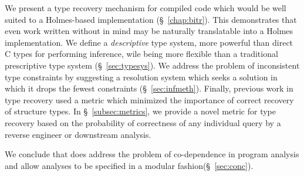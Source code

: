 We present a type recovery mechanism for compiled code which would be well suited to a Holmes-based implementation (\S~\ref{chap:bitr}).
This demonstrates that even work written without \sysname in mind may be naturally translatable into a Holmes implementation.
We define a \emph{descriptive} type system, more powerful than direct C types for performing inference, wile being more flexible than a traditional prescriptive type system (\S~\ref{sec:typesys}).
We address the problem of inconsistent type constraints by suggesting a resolution system which seeks a solution in which it drops the fewest constraints (\S~\ref{sec:infmeth}).
Finally, previous work in type recovery used a metric which minimized the importance of correct recovery of structure types.
In \S~\ref{subsec:metrics}, we provide a novel metric for type recovery based on the probability of correctness of any individual query by a reverse engineer or downstream analysis.

We conclude that \sysname does address the problem of co-dependence in program analysis and allow analyses to be specified in a modular fashion(\S~\ref{sec:conc}).
